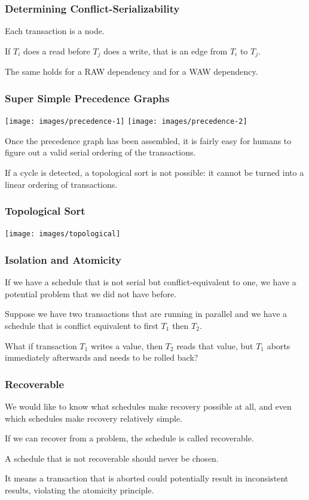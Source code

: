 \begin{frame}
\frametitle{Determining Conflict-Serializability}

Each transaction is a node. 

If $T_{i}$ does a read before $T_{j}$ does a write, that is an edge from $T_{i}$ to $T_{j}$. 

The same holds for a RAW dependency and for a WAW dependency. 

\end{frame}


\begin{frame}
\frametitle{Super Simple Precedence Graphs}

\begin{center}
\texttt{[image: images/precedence-1]}
\texttt{[image: images/precedence-2]}
\end{center}

Once the precedence graph has been assembled, it is fairly easy for humans to figure out a valid serial ordering of the transactions. 

If a cycle is detected, a topological sort is not possible: it cannot be turned into a linear ordering of transactions. 

\end{frame}

\begin{frame}
\frametitle{Topological Sort}

\begin{center}
\texttt{[image: images/topological]}
\end{center}


\end{frame}

\begin{frame}
\frametitle{Isolation and Atomicity}

If we have a schedule that is not serial but conflict-equivalent to one, we have a potential problem that we did not have before. 

Suppose we have two transactions that are running in parallel and we have a schedule that is conflict equivalent to first $T_{1}$ then $T_{2}$. 

What if transaction $T_{1}$ writes a value, then $T_{2}$ reads that value, but $T_{1}$ aborts immediately afterwards and needs to be rolled back? 

\end{frame}

\begin{frame}
\frametitle{Recoverable}

We would like to know what schedules make recovery possible at all, and even which schedules make recovery relatively simple. 

If we can recover from a problem, the schedule is called \alert{recoverable}. 

A schedule that is not recoverable should never be chosen.

It means a transaction that is aborted could potentially result in inconsistent results, violating the atomicity principle.

\end{frame}

